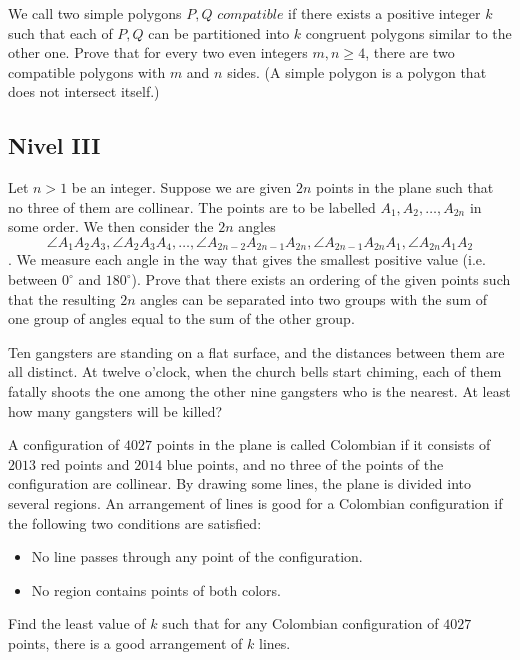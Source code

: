 \documentclass[11pt]{scrartcl}
\begin{document}
\begin{problem} %
    We call two simple polygons $P, Q$ $\textit{compatible}$ if there exists a positive integer $k$ such that each of $P, Q$ can be partitioned into $k$ congruent polygons similar to the other one. Prove that for every two even integers $m, n \geq 4$, there are two compatible polygons with $m$ and $n$ sides. (A simple polygon is a polygon that does not intersect itself.)
\end{problem}

\subsection{Nivel III}
\begin{problem} %
    Let $n>1$ be an integer. Suppose we are given $2n$ points in the plane such that no three of them are collinear. The points are to be labelled $A_1, A_2, \dots , A_{2n}$ in some order. We then consider the $2n$ angles $$\angle A_1A_2A_3, \angle A_2A_3A_4, \dots , \angle A_{2n-2}A_{2n-1}A_{2n}, \angle A_{2n-1}A_{2n}A_1, \angle A_{2n}A_1A_2$$. We measure each angle in the way that gives the smallest positive value (i.e. between $0^{\circ}$ and $180^{\circ}$). Prove that there exists an ordering of the given points such that the resulting $2n$ angles can be separated into two groups with the sum of one group of angles equal to the sum of the other group.
\end{problem}

\begin{problem} %
    Ten gangsters are standing on a flat surface, and the distances between them are all distinct. At twelve o’clock, when the church bells start chiming, each of them fatally shoots the one among the other nine gangsters who is the nearest. At least how many gangsters will be killed?
\end{problem}

\begin{problem} %
    A configuration of $4027$ points in the plane is called Colombian if it consists of $2013$ red points and $2014$ blue points, and no three of the points of the configuration are collinear. By drawing some lines, the plane is divided into several regions. An arrangement of lines is good for a Colombian configuration if the following two conditions are satisfied:
\begin{itemize}
\item No line passes through any point of the configuration.

\item No region contains points of both colors.
\end{itemize}
Find the least value of $k$ such that for any Colombian configuration of $4027$ points, there is a good arrangement of $k$ lines.
\end{problem}
\end{document}
